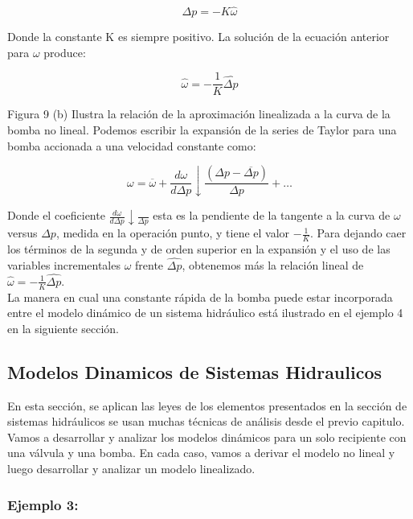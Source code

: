 \documentclass[a4paper,12pt,twoside]{proyectotanquesecci}
\begin{document}
\begin{equation}
\Delta p=-K\widehat {\omega}
\end{equation}

Donde la constante K es siempre positivo. La solución de la ecuación anterior para $\omega$ produce:

\begin{equation}
\widehat {\omega}=-\frac {1}{K}\widehat {\Delta p}
\end{equation}

Figura 9 (b) Ilustra la relación de la aproximación linealizada a la curva de la bomba no lineal. Podemos escribir la expansión de la series de Taylor para una bomba accionada a una velocidad constante como:

\begin{equation}
\omega =\overline {\omega }+\frac {d\omega }{d\Delta p} \downarrow \frac {\left( \Delta p-\overline {\Delta p}\right)}{\Delta p} +\ldots 
\end{equation}

Donde el coeficiente $\frac {d\omega }{d\Delta p} \downarrow \frac {}{\Delta p}$ esta es la pendiente de la tangente a la curva de $\omega$ versus $\Delta p$, medida en la operación punto, y tiene el valor $-\frac{1}{K}$. Para dejando caer los términos de la segunda y de orden superior en la expansión y el uso de las variables incrementales $\omega$ frente $\widehat{\Delta p}$, obtenemos más la relación lineal de $\widehat {\omega}=-\frac {1}{K}\widehat {\Delta p}$. \\
La manera en cual una constante rápida de la bomba puede estar incorporada entre el modelo dinámico de un sistema hidráulico está ilustrado en el ejemplo 4 en la siguiente sección. \\

\subsection{Modelos Dinamicos de Sistemas Hidraulicos}

En esta sección, se aplican las leyes de los elementos presentados en la sección de sistemas hidráulicos se usan muchas técnicas de análisis  desde el previo capitulo. Vamos a desarrollar y analizar los modelos dinámicos para un solo recipiente con una válvula y una bomba. En cada caso, vamos a derivar el modelo no lineal y luego desarrollar y analizar un modelo linealizado. \\

\subsubsection{Ejemplo 3:}
\end{document}
